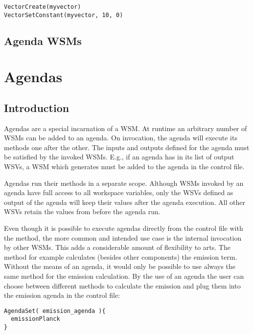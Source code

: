 \begin{lstlisting}
VectorCreate(myvector)
VectorSetConstant(myvector, 10, 0)
\end{lstlisting}

\subsection{Agenda WSMs}

\section{Agendas}
\label{sec:agendas:agendas}

\subsection{Introduction}
Agendas are a special incarnation of a WSM. At runtime an arbitrary
number of WSMs can be added to an agenda. On invocation, the agenda
will execute its methods one after the other. The inputs and outputs
defined for the agenda must be satisfied by the invoked WSMs. E.g., if
an agenda has  in its list of output WSVs, a WSM
which generates  must be added to the agenda in the
control file.

Agendas run their methods in a separate scope. Although WSMs invoked by
an agenda have full access to all workspace variables, only the WSVs
defined as output of the agenda will keep their values after the agenda
execution. All other WSVs retain the values from before the agenda
run.

Even though it is possible to execute agendas directly from the control
file with the  method, the more common and
intended use case is the internal invocation by other WSMs. This adds a
considerable amount of flexibility to arts.
The  method for example calculates
(besides other components) the emission term. Without the means of an agenda,
it would only be possible to use always the same method for the emission
calculation. By the use of an agenda the user can choose between different
methods to calculate the emission and plug them into the emission agenda in
the control file:

\begin{lstlisting}
AgendaSet( emission_agenda ){
  emissionPlanck
}
\end{lstlisting}





